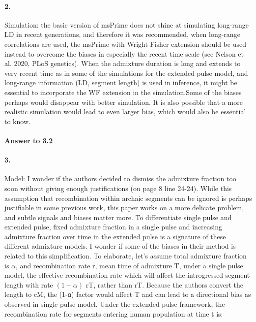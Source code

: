 \documentclass[11pt]{article}
\let\oldparagraph\paragraph
\renewcommand{\paragraph}[1]{\oldparagraph{#1}\mbox{}}
\begin{document}
\paragraph{2.}
Simulation: the basic version of msPrime does not shine at simulating long-range LD in recent generations, and therefore it was recommended, when long-range correlations are used, the msPrime with Wright-Fisher extension should be used instead to overcome the biases in especially the recent time scale (see Nelson et al. 2020, PLoS genetics). When the admixture duration is long and extends to very recent time as in some of the simulations for the extended pulse model, and long-range information (LD, segment length) is used in inference, it might be essential to incorporate the WF extension in the simulation.Some of the biases perhaps would disappear with better simulation. It is also possible that a more realistic simulation would lead to even larger bias, which would also be essential to know.

\paragraph{Answer to 3.2}

\paragraph{3.}
Model: I wonder if the authors decided to dismiss the admixture fraction too soon without giving enough justifications (on page 8 line 24-24). While this assumption that recombination within archaic segments can be ignored is perhaps justifiable in some previous work, this paper works on a more delicate problem, and subtle signals and biases matter more. To differentiate single pulse and extended pulse, fixed admixture fraction in a single pulse and increasing admixture fraction over time in the extended pulse is a signature of these different admixture models. I wonder if some of the biases in their method is related to this simplification. To elaborate, let’s assume total admixture fraction is $\alpha$, and recombination rate r, mean time of admixture T, under a single pulse model, the effective recombination rate which will affect the introgressed segment length with rate $(1-\alpha)$ rT, rather than rT. Because the authors convert the length to cM, the (1-α) factor would affect T and can lead to a directional bias as observed in single pulse model. Under the extended pulse framework, the recombination rate for segments entering human population at time t is:
\end{document}
